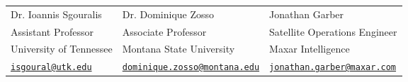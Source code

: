 

\begin{tabular}{l l l}
Dr. Ioannis Sgouralis & Dr. Dominique Zosso & Jonathan Garber\\
Assistant Professor & Associate Professor & Satellite Operations Engineer\\
University of Tennessee & Montana State University & Maxar Intelligence\\
{\href{mailto:isgoural@utk.edu}{\texttt{isgoural@utk.edu}}} &{\href{mailto:dominique.zosso@montana.edu}{\texttt{dominique.zosso@montana.edu}}} & {\href{mailto:jonathan.garber@maxar.com}{\texttt{jonathan.garber@maxar.com}}}\\


\end{tabular}